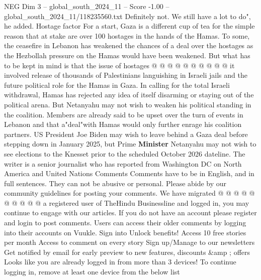 \begin{textsample}{NEG Dim 3 – global\_south\_2024\_11 – Score -1.00 – global\_south\_2024\_11/118235560.txt}
Definitely not.
We still have a lot to do", he added.
Hostage factor For a start, Gaza is a different cup of tea for the simple reason that at stake are over 100 hostages in the hands of the Hamas.
To some, the ceasefire in Lebanon has weakened the chances of a deal over the hostages as the Hezbollah pressure on the Hamas would have been weakened.
But what has to be kept in mind is that the issue of hostages @ @ @ @ @ @ @ @ @ @ it involved release of thousands of Palestinians languishing in Israeli jails and the future political role for the Hamas in Gaza.
In calling for the total Israeli withdrawal, Hamas has rejected any idea of itself disarming or staying out of the political arena.
But Netanyahu may not wish to weaken his political standing in the coalition.
Members are already said to be upset over the turn of events in Lebanon and that a"deal"with Hamas would only further enrage his coalition partners.
US President Joe Biden may wish to leave behind a Gaza deal before stepping down in January 2025, but Prime \textbf{Minister} Netanyahu may not wish to see elections to the Knesset prior to the scheduled October 2026 dateline.
The writer is a senior journalist who has reported from Washington DC on North America and United Nations Comments Comments have to be in English, and in full sentences.
They can not be abusive or personal.
Please abide by our community guidelines for posting your comments.
We have migrated @ @ @ @ @ @ @ @ @ @ a registered user of TheHindu Businessline and logged in, you may continue to engage with our articles.
If you do not have an account please register and login to post comments.
Users can access their older comments by logging into their accounts on Vuukle.
Sign into Unlock benefits!
Access 10 free stories per month Access to comment on every story Sign up/Manage to our newsletters Get notified by email for early preview to new features, discounts \&amp ; offers Looks like you are already logged in from more than 3 devices!
To continue logging in, remove at least one device from the below list

\end{textsample}
